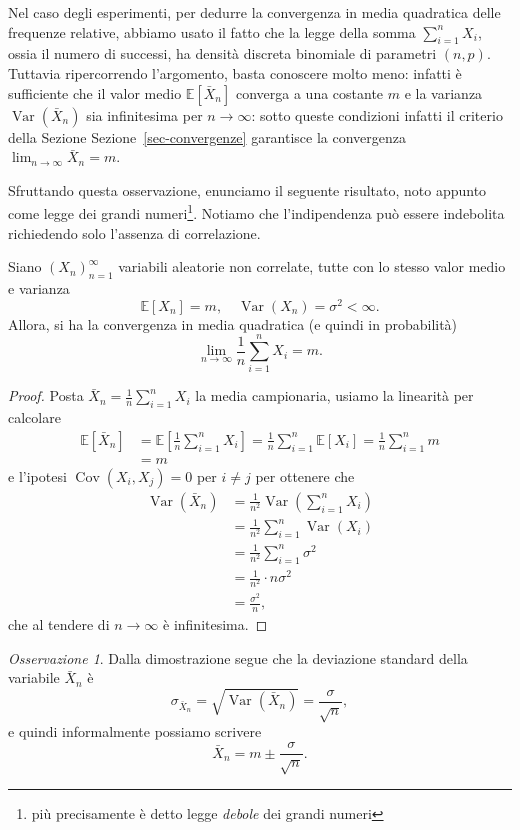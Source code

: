 \documentclass[
  italian,
  letterpaper,
]{book}
\newcommand{\bra}[1]{\left( #1 \right)}
\newcommand{\sqa}[1]{\left[ #1 \right]}
\newcommand{\E}[1]{\mathbb{E}\sqa{#1}}
\newcommand{\Var}[1]{\operatorname{Var}\bra{#1}}
\newcommand{\Cov}[1]{\operatorname{Cov}\bra{#1}}
\theoremstyle{definition}
\theoremstyle{remark}
\newtheorem*{remark}{Osservazione}
\begin{document}
Nel caso degli esperimenti, per dedurre la convergenza in media
quadratica delle frequenze relative, abbiamo usato il fatto che la legge
della somma \(\sum_{i=1}^nX_i\), ossia il numero di successi, ha densità
discreta binomiale di parametri \((n,p)\). Tuttavia ripercorrendo
l'argomento, basta conoscere molto meno: infatti è sufficiente che il
valor medio \(\E{\bar{X}_n}\) converga a una costante \(m\) e la
varianza \(\Var{\bar{X}_n}\) sia infinitesima per \(n \to \infty\):
sotto queste condizioni infatti il criterio della Sezione
Sezione~\ref{sec-convergenze} garantisce la convergenza
\(\lim_{n \to \infty} \bar{X}_n = m\).

Sfruttando questa osservazione, enunciamo il seguente risultato, noto
appunto come legge dei grandi numeri\footnote{più precisamente è detto
  legge \emph{debole} dei grandi numeri}. Notiamo che l'indipendenza può
essere indebolita richiedendo solo l'assenza di correlazione.

Siano \((X_n)_{n =1}^\infty\) variabili aleatorie non correlate, tutte
con lo stesso valor medio e varianza
\[ \E{X_n} = m, \quad \Var{X_n} = \sigma^2 < \infty.\] Allora, si ha la
convergenza in media quadratica (e quindi in probabilità)
\[ \lim_{n \to \infty} \frac{1}{n} \sum_{i=1}^n X_i = m.\]

\begin{proof}
Posta \(\bar{X}_n = \frac 1 n \sum_{i=1}^n X_i\) la media campionaria,
usiamo la linearità per calcolare\\
\[\begin{split} \E{\bar{X}_n } & = \E{ \frac  1 n \sum_{i=1}^n X_i}   = \frac 1 n \sum_{i=1}^n \E{X_i} = \frac 1 n \sum_{i=1}^n m \\
& = m \end{split}\] e l'ipotesi \(\Cov{X_i, X_j} = 0\) per \(i \neq j\)
per ottenere che
\[\begin{split} \Var{\bar{X}_n } & = \frac 1 {n^2}  \Var{\sum_{i=1}^n X_i}\\
& = \frac 1 {n^2} \sum_{i=1}^n \Var{X_i} \\
& = \frac 1{n^2 } \sum_{i=1}^n \sigma^2 \\
& = \frac{1}{n^2} \cdot  n \sigma^2 \\
& = \frac{\sigma^2}{n},
\end{split}\] che al tendere di \(n \to \infty\) è infinitesima.
\end{proof}

\begin{remark}
Dalla dimostrazione segue che la deviazione standard della variabile
\(\bar{X}_n\) è
\[\sigma_{\bar{X}_n} = \sqrt{ \Var{ \bar{X}_n}} = \frac{\sigma}{\sqrt{n}},\]
e quindi informalmente possiamo scrivere
\[ \bar{X}_n = m \pm  \frac{\sigma}{\sqrt{n}}.\]
\end{remark}
\end{document}
